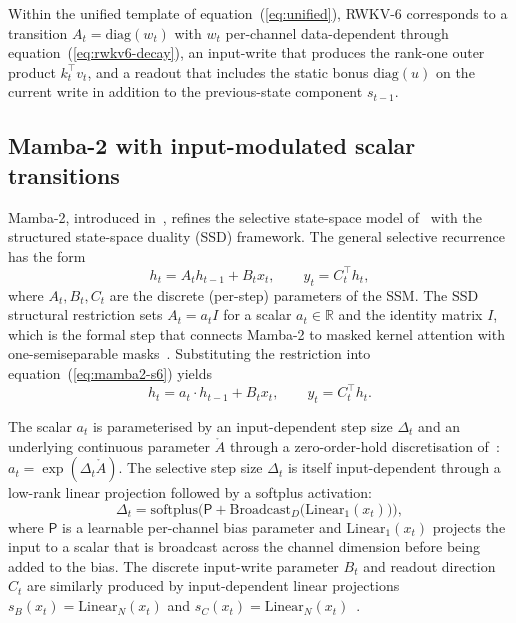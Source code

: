 Within the unified template of equation~(\ref{eq:unified}),
RWKV-6 corresponds to a transition
$A_{t} = \mathrm{diag}(w_{t})$ with $w_{t}$ per-channel
data-dependent through equation~(\ref{eq:rwkv6-decay}), an
input-write that produces the rank-one outer product
$k_{t}^{\top} v_{t}$, and a readout that includes the static
bonus $\mathrm{diag}(u)$ on the current write in addition to the
previous-state component $s_{t-1}$.

\subsection{Mamba-2 with input-modulated scalar transitions}\label{sec:backbones:mamba2}

Mamba-2, introduced in~\citet{dao2024transformers}, refines the
selective state-space model of~\citet{gu2023mamba} with the
structured state-space duality (SSD) framework. The general
selective recurrence has the form
\begin{equation}\label{eq:mamba2-s6}
h_{t} = A_{t} h_{t-1} + B_{t} x_{t}, \qquad y_{t} = C_{t}^{\top} h_{t},
\end{equation}
where $A_{t}, B_{t}, C_{t}$ are the discrete (per-step) parameters of
the SSM. The SSD structural restriction sets $A_{t} = a_{t} I$ for a
scalar $a_{t} \in \mathbb{R}$ and the identity matrix $I$, which is
the formal step that connects Mamba-2 to masked kernel attention with
one-semiseparable masks~\cite[Section~3]{dao2024transformers}.
Substituting the restriction into equation~(\ref{eq:mamba2-s6}) yields
\begin{equation}\label{eq:mamba2-ssd}
h_{t} = a_{t} \cdot h_{t-1} + B_{t} x_{t}, \qquad y_{t} = C_{t}^{\top} h_{t}.
\end{equation}

The scalar $a_{t}$ is parameterised by an input-dependent step size
$\Delta_{t}$ and an underlying continuous parameter $\mathring{A}$
through a zero-order-hold discretisation
of~\citet[eq.~zoh]{gu2023mamba}: $a_{t} = \exp(\Delta_{t} \mathring{A})$.
The selective step size $\Delta_{t}$ is itself input-dependent through
a low-rank linear projection followed by a softplus activation:
\begin{equation}\label{eq:mamba2-delta}
\Delta_{t} = \mathrm{softplus}\!\Big(\mathsf{P} + \mathrm{Broadcast}_{D}\!\big(\mathrm{Linear}_{1}(x_{t})\big)\Big),
\end{equation}
where $\mathsf{P}$ is a learnable per-channel bias parameter and
$\mathrm{Linear}_{1}(x_{t})$ projects the input to a scalar that is
broadcast across the channel dimension before being added to the bias.
The discrete input-write parameter $B_{t}$ and readout direction
$C_{t}$ are similarly produced by input-dependent linear projections
$s_{B}(x_{t}) = \mathrm{Linear}_{N}(x_{t})$ and $s_{C}(x_{t}) = \mathrm{Linear}_{N}(x_{t})$~\cite{gu2023mamba}.

